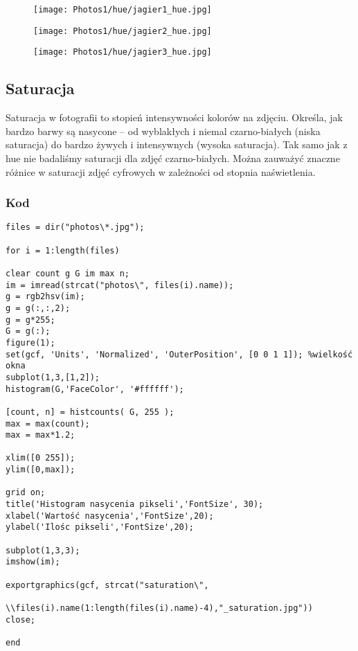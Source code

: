\documentclass[]{mwart}
\begin{document}
\begin{figure}[H]
    \centering
    \texttt{[image: Photos1/hue/jagier1\_hue.jpg]}

\end{figure}
\begin{figure}[H]
    \centering
    \texttt{[image: Photos1/hue/jagier2\_hue.jpg]}

\end{figure}
\begin{figure}[H]
    \centering
    \texttt{[image: Photos1/hue/jagier3\_hue.jpg]}

\end{figure}



\newpage
\subsection{Saturacja}
Saturacja w fotografii to stopień intensywności kolorów na zdjęciu. Określa,
jak bardzo barwy są nasycone -- od wyblakłych i niemal czarno-białych (niska
saturacja) do bardzo żywych i intensywnych (wysoka saturacja). Tak samo jak z
hue nie badaliśmy saturacji dla zdjęć czarno-białych. Można zauważyć znaczne
różnice w saturacji zdjęć cyfrowych w zależności od stopnia naświetlenia.

\subsubsection{Kod}
\begin{verbatim}
files = dir("photos\*.jpg");

for i = 1:length(files)

clear count g G im max n;
im = imread(strcat("photos\", files(i).name));
g = rgb2hsv(im);
g = g(:,:,2);
g = g*255;
G = g(:);
figure(1);
set(gcf, 'Units', 'Normalized', 'OuterPosition', [0 0 1 1]); %wielkość okna
subplot(1,3,[1,2]); 
histogram(G,'FaceColor', '#ffffff');

[count, n] = histcounts( G, 255 );
max = max(count);
max = max*1.2;

xlim([0 255]);
ylim([0,max]);

grid on;
title('Histogram nasycenia pikseli','FontSize', 30);
xlabel('Wartość nasycenia','FontSize',20);
ylabel('Ilośc pikseli','FontSize',20);

subplot(1,3,3);
imshow(im);

exportgraphics(gcf, strcat("saturation\", 
            \\files(i).name(1:length(files(i).name)-4),"_saturation.jpg"))
close;

end

\end{verbatim}
\end{document}
